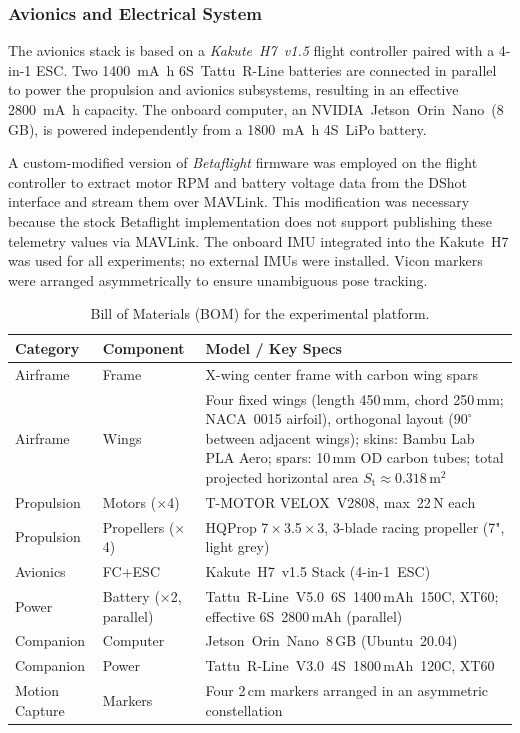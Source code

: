 \subsubsection{Avionics and Electrical System}
The avionics stack is based on a \textit{Kakute~H7~v1.5} flight controller paired with a 4-in-1 ESC. Two \SI{1400}{\milli\ampere\hour} 6S~Tattu~R-Line batteries are connected in parallel to power the propulsion and avionics subsystems, resulting in an effective \SI{2800}{\milli\ampere\hour} capacity. The onboard computer, an NVIDIA~Jetson~Orin~Nano~(8\,GB), is powered independently from a \SI{1800}{\milli\ampere\hour} 4S~LiPo battery.

A custom-modified version of \textit{Betaflight} firmware was employed on the flight controller to extract motor RPM and battery voltage data from the DShot interface and stream them over MAVLink. This modification was necessary because the stock Betaflight implementation does not support publishing these telemetry values via MAVLink. The onboard IMU integrated into the Kakute~H7 was used for all experiments; no external IMUs were installed. Vicon markers were arranged asymmetrically to ensure unambiguous pose tracking.

\begin{table}[h]
\centering
\caption{Bill of Materials (BOM) for the experimental platform.}
\label{tab:bom}
\small
\begin{tabularx}{\textwidth}{ll>{\raggedright\arraybackslash}X}
\toprule
Category & Component & Model / Key Specs \\
\midrule
Airframe & Frame & X-wing center frame with carbon wing spars \\
Airframe & Wings & Four fixed wings (length 450\,mm, chord 250\,mm; NACA~0015 airfoil), orthogonal layout ($90^{\circ}$ between adjacent wings); skins: Bambu Lab PLA Aero; spars: 10\,mm OD carbon tubes; total projected horizontal area $S_\mathrm{t}\approx 0.318$\,m$^2$ \\
Propulsion & Motors ($\times$4) & T-MOTOR VELOX~V2808, max~22\,N each \\
Propulsion & Propellers ($\times$4) & HQProp 7\,×\,3.5\,×\,3, 3-blade racing propeller (7", light grey) \\
Avionics & FC+ESC & Kakute~H7~v1.5 Stack (4-in-1~ESC) \\
Power & Battery ($\times$2, parallel) & Tattu~R-Line~V5.0~6S~1400\,mAh~150C, XT60; effective 6S~2800\,mAh (parallel) \\
Companion & Computer & Jetson~Orin~Nano~8\,GB (Ubuntu~20.04) \\
Companion & Power & Tattu~R-Line~V3.0~4S~1800\,mAh~120C, XT60 \\
Motion Capture & Markers & Four 2\,cm markers arranged in an asymmetric constellation \\
\bottomrule
\end{tabularx}
\end{table}

